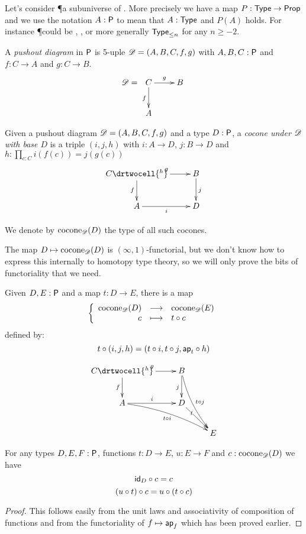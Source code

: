 Let’s consider \P a subuniverse of \type. More precisely we have a map
$P:\type\to\prop$ and we use the notation $A:\P$ to mean that $A:\type$ and
$P(A)$ holds. For instance \P could be \prop, \set, or more generally
$\typele{n}$ for any $n\ge-2$.

\begin{defn}
  A \emph{pushout diagram} in $\P$ is 5-uple $\Ddiag=(A,B,C,f,g)$ with
  $A,B,C:\P$ and $f:C\to{}A$ and $g:C\to{}B$.
  \[\Ddiag=\xymatrix{C \ar^g[r] \ar_f[d] & B \\ A & }\]
\end{defn}

\begin{defn}
  Given a pushout diagram $\Ddiag=(A,B,C,f,g)$ and a type $D:\P$, a
  \emph{cocone under $\Ddiag$ with base $D$} is a triple $(i, j, h)$ with
  $i:A\to{}D$, $j:B\to{}D$ and $h : \prod_{c:C}i(f(c))=j(g(c))$
  \[\uppercurveobject{{ }}\lowercurveobject{{ }}\twocellhead{{ }}
  \xymatrix{C \ar^g[r] \ar_f[d] \drtwocell{^h} & B \ar^j[d] \\ A \ar_i[r] & D
  }\]

  We denote by $\cocone{\Ddiag}{D}$ the type of all such cocones.
\end{defn}

The map $D\mapsto\cocone{\Ddiag}{D}$ is $(\infty,1)$-functorial, but we don’t
know how to express this internally to homotopy type theory, so we will only
prove the bits of functoriality that we need.

\begin{defn}
  Given $D,E:\P$ and a map $t:D\to{}E$, there is a map
  \[\function{\cocone{\Ddiag}{D}}{\cocone{\Ddiag}{E}}{c}{\composecocone{t}c}\]
  defined by:
  \[\composecocone{t}(i,j,h)=(t\circ{}i,t\circ{}j,\mapfunc{t}\circ{}h)\]

  \[\uppercurveobject{{ }}\lowercurveobject{{ }}\twocellhead{{ }}
  \xymatrix{C \ar^g[r] \ar_f[d] \drtwocell{^h} & B \ar_j[d]
    \ar@/_/^{t\circ{}j}[rdd] & \\
    A \ar^i[r] \ar@/^/_{t\circ{}i}[rrd] & D \ar[rd]|<<<<t & \\
    & & E }\]
\end{defn}

\begin{lem}
  For any types $D,E,F:\P$, functions $t:D\to{}E$, $u:E\to{}F$ and
  $c:\cocone{\Ddiag}{D}$ we have
  \[\composecocone{\idfunc[D]}c = c\]
  \[\composecocone{(u\circ{}t)}c=\composecocone{u}(\composecocone{t}c)\]
\end{lem}
\begin{proof}
  This follows easily from the unit laws and associativity of composition of
  functions and from the functoriality of $f\mapsto{}\mapfunc{f}$ which has been proved
  earlier.
\end{proof}

